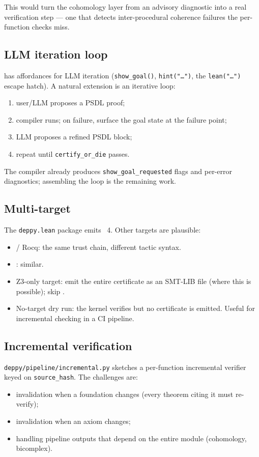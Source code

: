 This would turn the cohomology layer from an advisory diagnostic
into a real verification step --- one that detects
inter-procedural coherence failures the per-function checks miss.

\subsection{LLM iteration loop}

\PSDL{} has affordances for LLM iteration (\texttt{show\_goal()},
\texttt{hint("\dots")}, the \texttt{lean("\dots")} escape hatch).
A natural extension is an iterative loop:
\begin{enumerate}[leftmargin=1.7em]
  \item user/LLM proposes a PSDL proof;
  \item compiler runs; on failure, surface the goal state at the
    failure point;
  \item LLM proposes a refined PSDL block;
  \item repeat until \texttt{certify\_or\_die} passes.
\end{enumerate}

The compiler already produces \texttt{show\_goal\_requested}
flags and per-error diagnostics; assembling the loop is the
remaining work.

\subsection{Multi-target}

The \texttt{deppy.lean} package emits \Lean{}~4.  Other targets are
plausible:
\begin{itemize}[leftmargin=1.7em]
  \item \Coq{} / Rocq: the same trust chain, different tactic
    syntax.
  \item \Agda{}: similar.
  \item Z3-only target: emit the entire certificate as an SMT-LIB
    file (where this is possible); skip \Lean{}.
  \item No-target dry run: the kernel verifies but no certificate
    is emitted.  Useful for incremental checking in a CI pipeline.
\end{itemize}

\subsection{Incremental verification}

\texttt{deppy/pipeline/incremental.py} sketches a per-function
incremental verifier keyed on \texttt{source\_hash}.  The
challenges are:
\begin{itemize}[leftmargin=1.7em]
  \item invalidation when a foundation changes (every theorem
    citing it must re-verify);
  \item invalidation when an axiom changes;
  \item handling pipeline outputs that depend on the entire module
    (cohomology, bicomplex).
\end{itemize}

